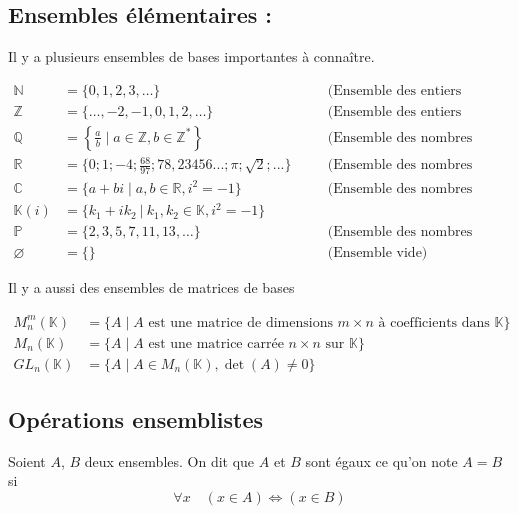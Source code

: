\subsection{Ensembles élémentaires :}
Il y a plusieurs ensembles de bases importantes à connaître.
\begin{mdframed}
    \[
\begin{aligned}
    \mathbb{N} &= \{0, 1, 2, 3, \dots\} \quad &&\text{(Ensemble des entiers naturels)} \\
    \mathbb{Z} &= \{\dots, -2, -1, 0, 1, 2, \dots\} \quad &&\text{(Ensemble des entiers relatifs)} \\
    \mathbb{Q} &= \left\{ \frac{a}{b} \mid a \in \mathbb{Z}, b \in \mathbb{Z}^* \right\} \quad &&\text{(Ensemble des nombres rationnels)} \\
    \mathbb{R} &= \{0;1;-4;\frac{68}{97}; 78,23456...;\pi;\sqrt{2};...\}\quad &&\text{(Ensemble des nombres réels)} \\
    \mathbb{C} &= \{ a + bi \mid a, b \in \mathbb{R}, i^2 = -1 \} \quad &&\text{(Ensemble des nombres complexes)} \\
    \mathbb{K}(i)&=\{k_1+ik_2\: |\: k_1,k_2\in \mathbb{K},i^2=-1\}\\
    \mathbb{P} &= \{2, 3, 5, 7, 11, 13, \dots\} \quad &&\text{(Ensemble des nombres premiers)} \\
    \varnothing &= \{\} \quad &&\text{(Ensemble vide)}
\end{aligned}
\]
\end{mdframed}
Il y a aussi des ensembles de matrices de bases
\begin{mdframed}
\[
\begin{aligned}
    M_{n}^m(\mathbb{K}) &= \{ A \mid A \text{ est une matrice de dimensions } m \times n \text{ à coefficients dans } \mathbb{K} \} \\
    M_n(\mathbb{K}) &= \{ A \mid A \text{ est une matrice carrée } n \times n \text{ sur } \mathbb{K} \} \\
    GL_n(\mathbb{K}) &= \{ A \mid A \in M_n(\mathbb{K}), \det(A) \neq 0 \}
\end{aligned}
\]
\end{mdframed}

\subsection{Opérations ensemblistes}


    \begin{definition}[Égalité]
        Soient $A$, $B$ deux ensembles. On dit que $A$ et $B$ sont égaux ce qu'on note $A=B$ si
        \[
        \forall x \quad (x\in A)\Leftrightarrow(x\in B)
        \]
    \end{definition}

